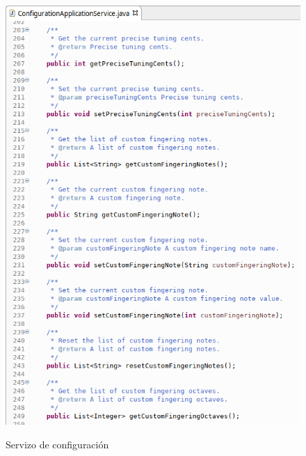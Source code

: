    \begin{figure}[htbp]
    \centering
    \includegraphics[scale=0.6, keepaspectratio=true]{./imagenes/servizo-configuracion-5.png} \\
    \caption{Servizo de configuración}
    \label{figura:ServizoConfiguracion5}
   \end{figure}
   
